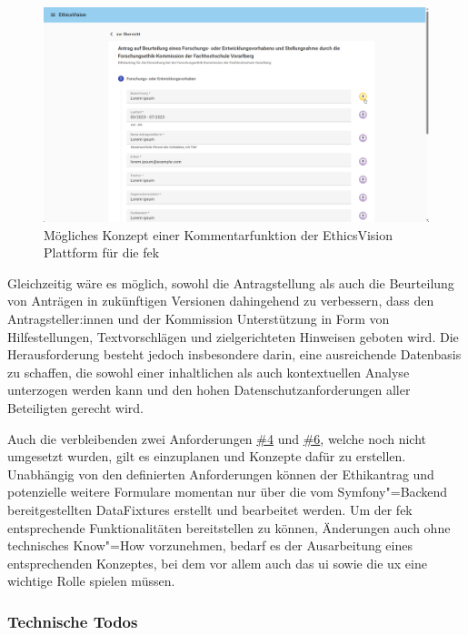 \documentclass[a4paper,12pt,twoside,numbers=noendperiod]{scrreprt}
\begin{document}
\begin{figure}[ht]
    \centering
    \includegraphics[width=\linewidth]{thesis/images/Luidold_EthicsVision-Kommentar-Vorschau.pdf}
    \caption{Mögliches Konzept einer Kommentarfunktion der EthicsVision Plattform für die \acl{fek}}
    \label{fig:ethics-vision-kommentarfunktion}
\end{figure}

Gleichzeitig wäre es möglich, sowohl die Antragstellung als auch die Beurteilung von Anträgen in zukünftigen Versionen dahingehend zu verbessern, dass den Antragsteller:innen und der Kommission Unterstützung in Form von Hilfestellungen, Textvorschlägen und zielgerichteten Hinweisen geboten wird. Die Herausforderung besteht jedoch insbesondere darin, eine ausreichende Datenbasis zu schaffen, die sowohl einer inhaltlichen als auch kontextuellen Analyse unterzogen werden kann und den hohen Datenschutzanforderungen aller Beteiligten gerecht wird.

Auch die verbleibenden zwei Anforderungen \hyperref[sub-sub-sec:abgeleitete-anforderungen-während-erstellung-einreichung]{\#4} und \hyperref[sub-sub-sec:abgeleitete-anforderungen-während-erstellung-einreichung]{\#6}, welche noch nicht umgesetzt wurden, gilt es einzuplanen und Konzepte dafür zu erstellen. Unabhängig von den definierten Anforderungen können der Ethikantrag und potenzielle weitere Formulare momentan nur über die vom Symfony"=Backend bereitgestellten DataFixtures erstellt und bearbeitet werden. Um der \ac{fek} entsprechende Funktionalitäten bereitstellen zu können, Änderungen auch ohne technisches Know"=How vorzunehmen, bedarf es der Ausarbeitung eines entsprechenden Konzeptes, bei dem vor allem auch das \ac{ui} sowie die \ac{ux} eine wichtige Rolle spielen müssen.

\subsubsection*{Technische Todos}
\end{document}
